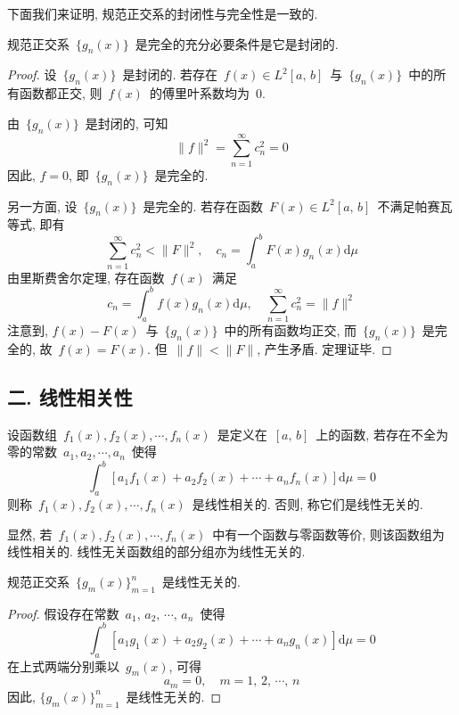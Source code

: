 下面我们来证明, 规范正交系的封闭性与完全性是一致的.

\begin{Theorem}
规范正交系~$\{g_{n}(x)\}$~是完全的充分必要条件是它是封闭的.
\end{Theorem}

\begin{proof}
设~$\{g_{n}(x)\}$~是封闭的. 若存在~$f(x)\in L^2[a,\,b]$~与~$\{g_{n}(x)\}$~中的所有函数都正交, 则~$f(x)$~的傅里叶系数均为~0.

由~$\{g_{n}(x)\}$~是封闭的, 可知
\[
\|f\|^{2}=\sum_{n=1}^{\infty}c_{n}^{2}=0
\]
因此, $f=0$, 即~$\{g_{n}(x)\}$~是完全的.

另一方面, 设~$\{g_{n}(x)\}$~是完全的. 若存在函数~$F(x)\in L^2[a,\,b]$~不满足帕赛瓦等式, 即有
\[
\sum_{n=1}^{\infty}c_{n}^{2}<\|F\|^{2},\quad c_{n}=\int_{a}^{b}F(x)g_{n}(x)\mathrm{d}\mu
\]
由里斯\raisebox{0.5mm}{--}费舍尔定理, 存在函数~$f(x)$~满足
\[
c_{n}=\int_{a}^{b}f(x)g_{n}(x)\mathrm{d}\mu, \quad \sum_{n=1}^{\infty}c_{n}^{2}=\|f\|^{2}
\]
注意到, $f(x)-F(x)$~与~$\{g_{n}(x)\}$~中的所有函数均正交, 而~$\{g_{n}(x)\}$~是完全的, 故~$f(x)=F(x)$.
但~$\|f\|<\|F\|$, 产生矛盾. 定理证毕.
\end{proof}

\subsection*{二. 线性相关性}

\begin{Definition}
设函数组~$f_{1}(x), f_{2}(x), \cdots,  f_{n}(x)$~是定义在~$[a,\,b]$~上的函数, 若存在不全为零的常数~$a_{1}, a_{2}, \cdots, a_{n}$~使得
\[
\int_{a}^{b}\left[a_{1}f_{1}(x)+a_{2}f_{2}(x)+\cdots+a_{n}f_{n}(x)\right]\mathrm{d}\mu=0
\]
则称~$f_{1}(x), f_{2}(x), \cdots,  f_{n}(x)$~是线性相关的. 否则, 称它们是线性无关的.
\end{Definition}

显然, 若~$f_{1}(x), f_{2}(x), \cdots,  f_{n}(x)$~中有一个函数与零函数等价, 则该函数组为线性相关的. 线性无关函数组的部分组亦为线性无关的.

\begin{Theorem}\label{norm}
规范正交系~$\{g_{m}(x)\}_{m=1}^{n}$~是线性无关的.
\end{Theorem}

\begin{proof}
假设存在常数~$a_{1}, \, a_{2}, \, \cdots, \, a_{n}$~使得
\[
\int_{a}^{b}\left[a_{1}g_{1}(x)+a_{2}g_{2}(x)+\cdots+a_{n}g_{n}(x)\right]\mathrm{d}\mu=0
\]
在上式两端分别乘以~$g_{m}(x)$, 可得
\[
a_{m}=0, \quad m=1, \, 2,\, \cdots,\, n
\]
因此, $\{g_{m}(x)\}_{m=1}^{n}$~是线性无关的.

\end{proof}

